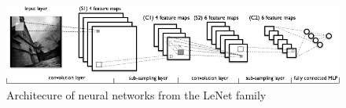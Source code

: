 \begin{figure}[h]
\begin{center}
\includegraphics[width=0.7\columnwidth]{img/mylenet.png}
\caption{
\label{fig:lenet_conv}
Architecure of neural networks from the LeNet family \cite{lenet_conv}
}
\end{center}
\end{figure}